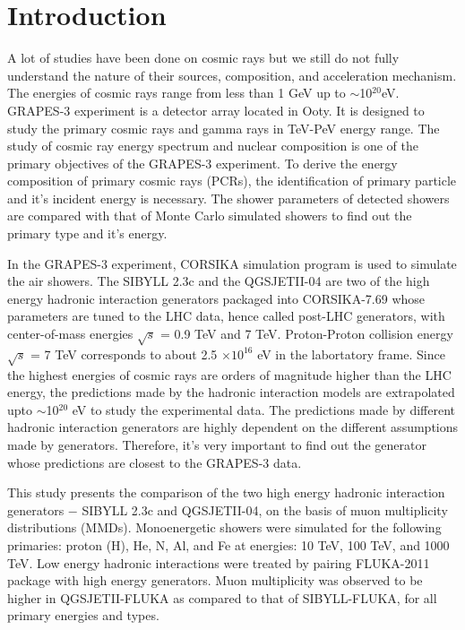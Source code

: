 \documentclass[12pt]{article}
\begin{document}
\section{Introduction}

A lot of studies have been done on cosmic rays but we still do not fully
understand the nature of their sources, composition, and acceleration
mechanism. The energies of cosmic rays range from less than 1 GeV up to
$\sim$10$^{20}$eV.  GRAPES-3 experiment is a detector array located in Ooty. It
is designed to study the primary cosmic rays and gamma rays in TeV-PeV energy
range. The study of cosmic ray energy spectrum and nuclear composition is one
of the primary objectives of the GRAPES-3 experiment. To derive the energy
composition of primary cosmic rays (PCRs), the identification of primary
particle and it's incident energy is necessary. The shower parameters of
detected showers are compared with that of Monte Carlo simulated showers to
find out the primary type and it's energy. 

In the GRAPES-3 experiment, CORSIKA simulation program is used to simulate the
air showers. The SIBYLL 2.3c and the QGSJETII-04 are two of the high energy
hadronic interaction generators packaged into CORSIKA-7.69 whose parameters are
tuned to the LHC data, hence called post-LHC generators, with center-of-mass
energies $\sqrt{s}$ = 0.9 TeV and 7 TeV. Proton-Proton collision energy
$\sqrt{s}$ = 7 TeV corresponds to about 2.5 $\times 10^{16}$ eV in the
labortatory frame.  Since the highest energies of cosmic rays are orders of
magnitude higher than the LHC energy, the  predictions made by the hadronic
interaction models are extrapolated upto $\sim$10$^{20}$ eV  to study the
experimental data. The predictions made by different hadronic interaction
generators are highly dependent on the different assumptions made by
generators. Therefore, it's very important to find out the generator whose
predictions are closest to the GRAPES-3 data. 

This study presents the comparison of the two high energy hadronic interaction
generators $-$ SIBYLL 2.3c and QGSJETII-04, on the basis of muon multiplicity
distributions (MMDs). Monoenergetic showers were simulated for the following
primaries: proton (H), He, N, Al, and Fe at energies: 10 TeV, 100 TeV, and 1000
TeV. Low energy hadronic interactions were treated by pairing FLUKA-2011
package with high energy generators. Muon multiplicity was observed to be
higher in QGSJETII-FLUKA as compared to that of SIBYLL-FLUKA, for all primary
energies and types.
\end{document}
